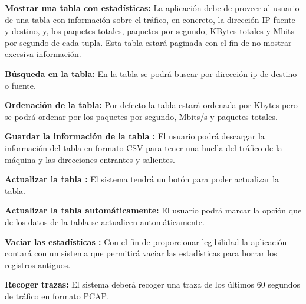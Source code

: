 \begin{functional}
        \setcounter{enumi}{5}
        
        \item \textbf{Mostrar una tabla con estadísticas:} La aplicación debe de proveer al usuario de una tabla con información sobre el tráfico, en concreto, la dirección IP fuente y destino, y, los paquetes totales, paquetes por segundo, KBytes totales y Mbits por segundo de cada tupla. Esta tabla estará paginada con el fin de no mostrar excesiva información.
        \begin{functional}
        \item \textbf{Búsqueda en la tabla:} En la tabla se podrá buscar por dirección ip de destino o fuente. 
        \item \textbf{Ordenación de la tabla:} Por defecto la tabla estará ordenada por Kbytes pero se podrá ordenar por los paquetes por segundo, Mbits/s y paquetes totales.
        \item \textbf{Guardar la información de la tabla :} El usuario podrá descargar la información del tabla en formato CSV para tener una huella del tráfico de la máquina y las direcciones entrantes y salientes.
        \item \textbf{Actualizar la tabla :} El sistema tendrá un botón para poder actualizar la tabla.
        \item \textbf{Actualizar la tabla automáticamente:} El usuario podrá marcar la opción que de los datos de la tabla se actualicen automáticamente.
        \item \textbf{Vaciar las estadísticas :} Con el fin de proporcionar legibilidad la aplicación contará con un sistema que permitirá vaciar las estadísticas para borrar los registros antiguos.
        \end{functional}
        \item \textbf{Recoger trazas:} El sistema deberá recoger una traza de los últimos 60 segundos de tráfico en formato PCAP. 
\end{functional}
